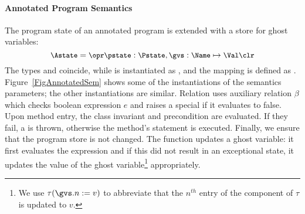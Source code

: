 



\paragraph{Annotated Program Semantics}

The program state of an annotated program is extended with a store for
ghost variables:
\[{\small
\Astate = \opr \pstate : \Pstate, \gvs : \Name \mapsto \Val \clr}
\]
The types \FullProgram and \Program coincide, while \FullState is
instantiated as \Astate, and the mapping \progstate is defined as
\pstate. Figure~\ref{FigAnnotatedSem} shows some of the
instantiations of the semantics parameters; %
the other instantiations are similar. Relation \gammain uses 
auxiliary relation \(\beta\) which checks boolean expression \(e\) and
raises a special \JMLExc if it evaluates to false. Upon method
entry, the class invariant and precondition are evaluated. If they
fail, a \JMLExc is thrown, otherwise the method's \preset statement is
executed. Finally, we ensure that the program store is not changed.
The function
\deltaset updates a ghost variable: it first evaluates the expression
and if this did not result in an exceptional state, it updates the
value of the ghost variable\footnote{We use \(\tau(\gvs.n := v)\) to
abbreviate that the \(n^{th}\) entry of the \gvs component of \(\tau\) is
updated to \(v\).} appropriately.


